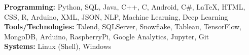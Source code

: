 

\begin{cvparagraph}
{\vspace{-1.25mm}}
{\textbf{Programming:}}
{Python, SQL, Java, C++, C, Android, C\#, LaTeX, HTML, CSS, R, Arduino, XML, JSON, NLP, Machine Learning, Deep Learning}
{\\}
{\textbf{Tools/Technologies:}}
{Talend, SQLServer, Snowflake, Tableau, TensorFlow, MongoDB, Arduino, RaspberryPi, Google Analytics, Jupyter, Git}
{\\}
{\textbf{Systems:}}
{Linux (Shell), Windows}
\end{cvparagraph}
\vspace{-4.5mm}
